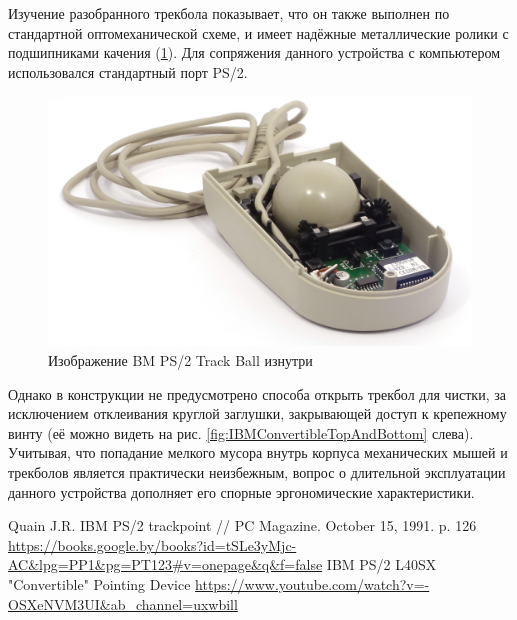 \documentclass[11pt, a4paper]{article}
\begin{document}
Изучение разобранного трекбола показывает, что он также выполнен по стандартной оптомеханической схеме, и имеет надёжные металлические ролики с подшипниками качения (\ref{fig:IBMConvertibleInside}). Для сопряжения данного устройства с компьютером использовался стандартный порт PS/2.

\begin{figure}[h]
    \centering
    \includegraphics[scale=0.7]{1992_ibm_convertible/inside_60.jpg}
    \caption{Изображение BM PS/2 Track Ball изнутри}
    \label{fig:IBMConvertibleInside}
\end{figure}

Однако в конструкции не предусмотрено способа открыть трекбол для чистки, за исключением отклеивания круглой заглушки, закрывающей доступ к крепежному винту (её можно видеть на рис. \ref{fig:IBMConvertibleTopAndBottom} слева). Учитывая, что попадание мелкого мусора внутрь корпуса механических мышей и трекболов является практически неизбежным, вопрос о длительной эксплуатации данного устройства дополняет его спорные эргономические характеристики.

\begin{thebibliography}{9}
 Quain J.R. IBM PS/2 trackpoint // PC Magazine. October 15, 1991. p. 126 \url{https://books.google.by/books?id=tSLe3yMjc-AC&lpg=PP1&pg=PT123#v=onepage&q&f=false}
 IBM PS/2 L40SX "Convertible" Pointing Device \url{https://www.youtube.com/watch?v=-OSXeNVM3UI&ab_channel=uxwbill}
\end{thebibliography}
\end{document}
